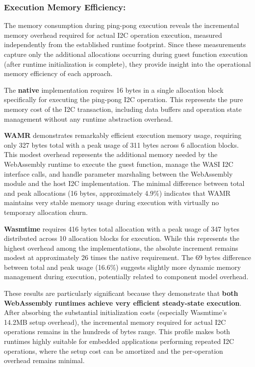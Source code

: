 \subsubsection{Execution Memory Efficiency:}
The memory consumption during ping-pong execution reveals the incremental memory overhead required for actual I2C operation execution, measured independently from the established runtime footprint. Since these measurements capture only the additional allocations occurring during guest function execution (after runtime initialization is complete), they provide insight into the operational memory efficiency of each approach.

The \textbf{native} implementation requires 16 bytes in a single allocation block specifically for executing the ping-pong I2C operation. This represents the pure memory cost of the I2C transaction, including data buffers and operation state management without any runtime abstraction overhead.

\textbf{WAMR} demonstrates remarkably efficient execution memory usage, requiring only 327 bytes total with a peak usage of 311 bytes across 6 allocation blocks. This modest overhead represents the additional memory needed by the WebAssembly runtime to execute the guest function, manage the WASI I2C interface calls, and handle parameter marshaling between the WebAssembly module and the host I2C implementation. The minimal difference between total and peak allocations (16 bytes, approximately 4.9\%) indicates that WAMR maintains very stable memory usage during execution with virtually no temporary allocation churn.

\textbf{Wasmtime} requires 416 bytes total allocation with a peak usage of 347 bytes distributed across 10 allocation blocks for execution. While this represents the highest overhead among the implementations, the absolute increment remains modest at approximately 26 times the native requirement. The 69 bytes difference between total and peak usage (16.6\%) suggests slightly more dynamic memory management during execution, potentially related to component model overhead.

These results are particularly significant because they demonstrate that \textbf{both WebAssembly runtimes achieve very efficient steady-state execution}. After absorbing the substantial initialization costs (especially Wasmtime's 14.2MB setup overhead), the incremental memory required for actual I2C operations remains in the hundreds of bytes range. This profile makes both runtimes highly suitable for embedded applications performing repeated I2C operations, where the setup cost can be amortized and the per-operation overhead remains minimal.

